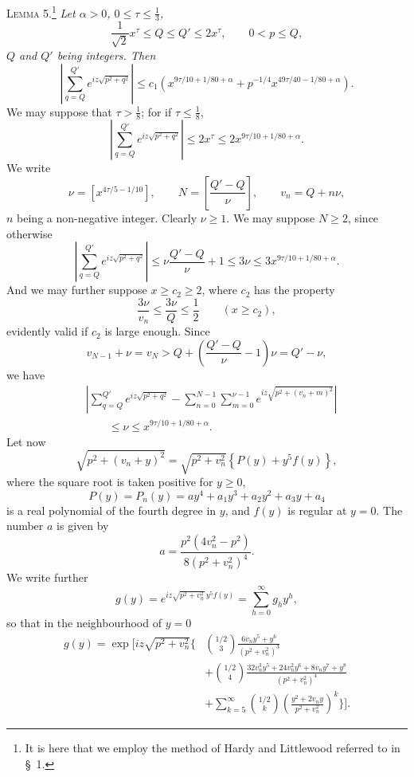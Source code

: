 \documentclass[11pt]{article}
\begin{document}
\medskip
\noindent\textsc{Lemma 5.}\footnote{It is here that we employ the method of
Hardy and Littlewood referred to in \S~1.}
\textit{Let $\alpha>0$, $0\leq\tau\leq\frac13$,
\[
 \frac1{\sqrt2}x^\tau\leq Q\leq Q'\leq2x^\tau,
 \qquad 0<p\leq Q,
\]
$Q$ and $Q'$ being integers. Then}
\begin{equation}
 \left|\sum_{q=Q}^{Q'}e^{iz\sqrt{p^2+q^2}}\right|
 \leq c_1\left(x^{9\tau/10+1/80+\alpha}
 +p^{-1/4}x^{49\tau/40-1/80+\alpha}\right).
 \tag{5.2}
\end{equation}
We may suppose that $\tau>\frac18$; for if $\tau\leq\frac18$,
\[
 \left|\sum_{q=Q}^{Q'}e^{iz\sqrt{p^2+q^2}}\right|
 \leq2x^\tau\leq2x^{9\tau/10+1/80+\alpha}.
\]
We write
\[
 \nu=\left[x^{4\tau/5-1/10}\right],\qquad
 N=\left[\frac{Q'-Q}{\nu}\right],\qquad
 v_n=Q+n\nu,
\]
$n$ being a non-negative integer. Clearly $\nu\geq1$. We may suppose $N\geq2$,
since otherwise
\[
 \left|\sum_{q=Q}^{Q'}e^{iz\sqrt{p^2+q^2}}\right|
 \leq\nu\frac{Q'-Q}{\nu}+1\leq3\nu
 \leq3x^{9\tau/10+1/80+\alpha}.
\]
And we may further suppose $x\geq c_2\geq2$, where $c_2$ has the property
\[
 \frac{3\nu}{v_n}\leq\frac{3\nu}{Q}\leq\frac12
 \qquad(x\geq c_2),
\]
evidently valid if $c_2$ is large enough. Since
\[
 v_{N-1}+\nu=v_N>Q+\left(\frac{Q'-Q}{\nu}-1\right)\nu=Q'-\nu,
\]
we have
\begin{equation}
\begin{aligned}
&\left|\sum_{q=Q}^{Q'}e^{iz\sqrt{p^2+q^2}}
 -\sum_{n=0}^{N-1}\sum_{m=0}^{\nu-1}
 e^{iz\sqrt{p^2+(v_n+m)^2}}\right| \\
&\qquad\leq\nu\leq x^{9\tau/10+1/80+\alpha}.
\end{aligned}
\tag{5.3}
\end{equation}
Let now
\[
 \sqrt{p^2+(v_n+y)^2}
 =\sqrt{p^2+v_n^2}\left\{P(y)+y^5f(y)\right\},
\]
where the square root is taken positive for $y\geq0$,
\[
 P(y)=P_n(y)=ay^4+a_1y^3+a_2y^2+a_3y+a_4
\]
is a real polynomial of the fourth degree in $y$, and $f(y)$ is regular at
$y=0$. The number $a$ is given by
\begin{equation}
 a=\frac{p^2(4v_n^2-p^2)}{8(p^2+v_n^2)^4}.
 \tag{5.4}
\end{equation}
We write further
\[
 g(y)=e^{iz\sqrt{p^2+v_n^2}\,y^5f(y)}=\sum_{h=0}^{\infty}g_h y^h,
\]
so that in the neighbourhood of $y=0$
\begin{align*}
 g(y)=\exp\Bigg[iz\sqrt{p^2+v_n^2}\Bigg\{&
 \binom{1/2}{3}\frac{6v_ny^5+y^6}{(p^2+v_n^2)^3} \\
 &+\binom{1/2}{4}
 \frac{32v_n^3y^5+24v_n^2y^6+8v_ny^7+y^8}{(p^2+v_n^2)^4} \\
 &+\sum_{k=5}^{\infty}\binom{1/2}{k}
 \left(\frac{y^2+2v_ny}{p^2+v_n^2}\right)^k\Bigg\}\Bigg].
\end{align*}
\end{document}

